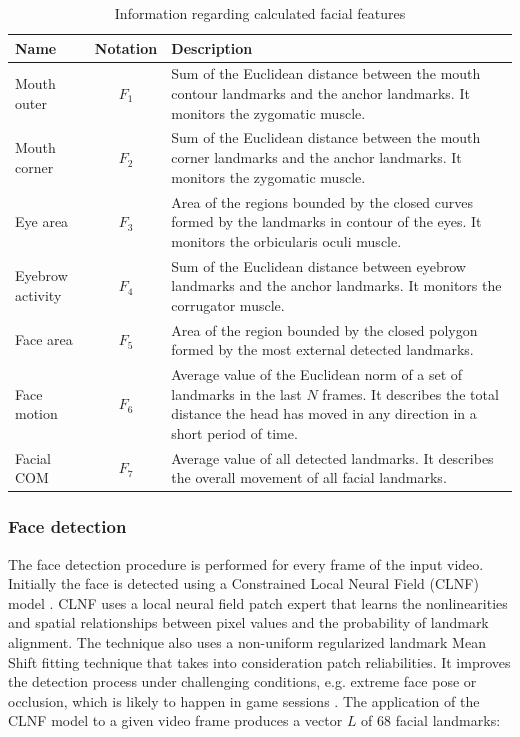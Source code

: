 \begin{landscape}
\begin{table}
    \centering
    \caption{Information regarding calculated facial features}
    \label{table:features}
    \begin{tabular}[l]{@{}lcp{11cm}}
        \hline
            \textbf{Name} & \textbf{Notation} & \textbf{Description} \\
        \hline
            Mouth outer & $F_1$ & Sum of the Euclidean distance between the mouth contour landmarks and the anchor landmarks. It monitors the zygomatic muscle.  \\
            Mouth corner & $F_2$ & Sum of the Euclidean distance between the mouth corner landmarks and the anchor landmarks. It monitors the zygomatic muscle. \\
            Eye area & $F_3$ & Area of the regions bounded by the closed curves formed by the landmarks in contour of the eyes. It monitors the orbicularis oculi muscle. \\
            Eyebrow activity & $F_4$ & Sum of the Euclidean distance between eyebrow landmarks and the anchor landmarks. It monitors the corrugator muscle.  \\
            Face area & $F_5$ & Area of the region bounded by the closed polygon formed by the most external detected landmarks.  \\
            Face motion & $F_6$ & Average value of the Euclidean norm of a set of landmarks in the last $N$ frames. It describes the total distance the head has moved in any direction in a short period of time.  \\
            Facial COM & $F_7$ & Average value of all detected landmarks. It describes the overall movement of all facial landmarks.  \\
        \hline
    \end{tabular}
\end{table}
\end{landscape}

\subsubsection{Face detection}

The face detection procedure is performed for every frame of the input video. Initially the face is detected using a Constrained Local Neural Field (CLNF) model \parencite{baltrusaitis2013constrained,baltruvsaitis2016openface}. CLNF uses a local neural field patch expert that learns the nonlinearities and spatial relationships between pixel values and the probability of landmark alignment. The technique also uses a non-uniform regularized landmark Mean Shift fitting technique that takes into consideration patch reliabilities. It improves the detection process under challenging conditions, e.g. extreme face pose or occlusion, which is likely to happen in game sessions \parencite{bevilacqua2016variations}. The application of the CLNF model to a given video frame produces a vector $L$ of 68 facial landmarks:

